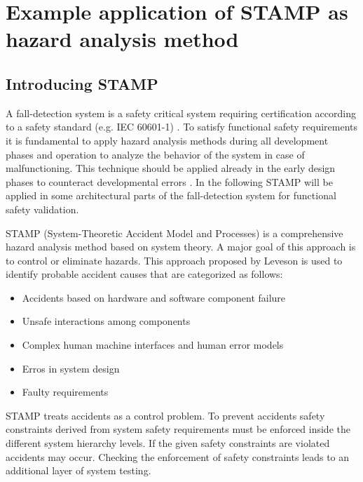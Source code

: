 \documentclass[review]{elsarticle}
\begin{document}
\section{Example application of STAMP as hazard analysis method}
\label{sec:STAMP}

\subsection{Introducing STAMP}
A fall-detection system is a safety critical system requiring certification according to a safety standard (e.g. IEC 60601-1) \cite{international2005medical}. To satisfy functional safety requirements it is fundamental to apply hazard analysis methods during all development phases and operation to analyze the behavior of the system in case of malfunctioning. This technique should be applied already in the early design phases to counteract developmental errors \cite{STAMPThesis}. In the following STAMP will be applied in some architectural parts of the fall-detection system for functional safety validation.

STAMP (System-Theoretic Accident Model and Processes) is a comprehensive hazard analysis method based on system theory. A major goal of this approach is to control or eliminate hazards. This approach proposed by Leveson \cite{leveson2011engineering} is used to identify probable accident causes that are categorized as follows:
\begin{itemize}
	\item Accidents based on hardware and software component failure
	\item Unsafe interactions among components
	\item Complex human machine interfaces and human error models
	\item Erros in system design
	\item Faulty requirements
\end{itemize}  
STAMP treats accidents as a control problem. To prevent accidents safety constraints derived from system safety requirements must be enforced inside the different system hierarchy levels. If the given safety constraints are violated accidents may occur. Checking the enforcement of safety constraints leads to an additional layer of system testing. 
\end{document}

